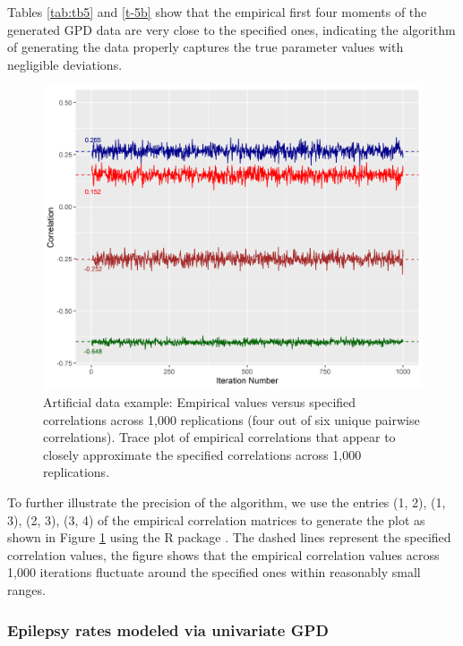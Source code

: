 Tables \ref{tab:tb5} and \ref{t-5b} show that the empirical first four moments of the generated GPD data are very close to the specified ones, indicating the algorithm of generating the data properly captures the true parameter values with negligible deviations.

\begin{center}
\begin{figure}[H]
\centering
\includegraphics[width = \textwidth, height=0.8\textwidth,keepaspectratio]{artificial_alt.png}
\caption{Artificial data example: Empirical values versus specified correlations across 1,000 replications (four out of six unique pairwise correlations). Trace plot of empirical correlations that appear to closely approximate the specified correlations across 1,000 replications.}
 \label{f-1}
\end{figure}
\end{center}

To further illustrate the precision of the algorithm, we use the entries (1, 2), (1, 3), (2, 3), (3, 4) of the empirical correlation matrices to generate the plot as shown in Figure \ref{f-1} using the R package  \citep{ggplot2}. The dashed lines represent the specified correlation values, the figure shows that the empirical correlation values across 1,000 iterations fluctuate around the specified ones within reasonably small ranges.

\subsubsection{Epilepsy rates modeled via univariate GPD}

